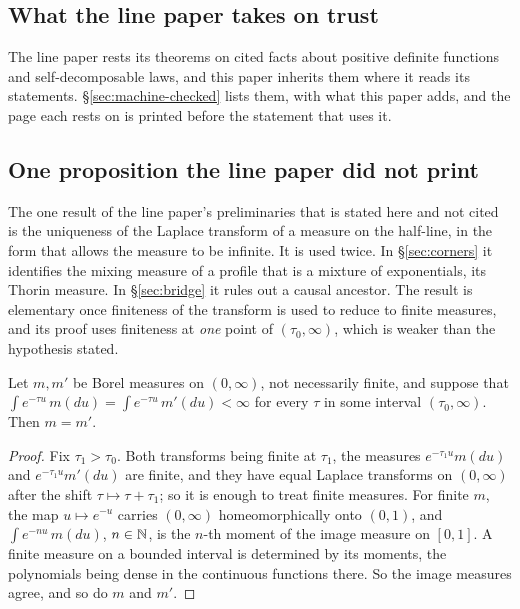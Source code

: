 \subsection{What the line paper takes on trust}\label{sec:line-trust}

The line paper rests its theorems on cited facts about positive definite functions and
self-decomposable laws, and this paper inherits them where it reads its statements.
\S\ref{sec:machine-checked} lists them, with what this paper adds, and the page each rests on
is printed before the statement that uses it.

\subsection{One proposition the line paper did not print}\label{sec:laplace-uniqueness}

The one result of the line paper's preliminaries that is stated here and not cited is the
uniqueness of the Laplace transform of a measure on the half-line, in the form that allows the
measure to be infinite. It is used twice. In \S\ref{sec:corners} it identifies the mixing
measure of a profile that is a mixture of exponentials, its Thorin measure. In
\S\ref{sec:bridge} it rules out a causal ancestor. The result is elementary once finiteness of
the transform is used to reduce to finite measures, and its proof uses finiteness at \emph{one}
point of $(\tau_0,\infty)$, which is weaker than the hypothesis stated.

\begin{proposition}
\label{prop:laplace-uniqueness-locally-finite}
Let $m, m'$ be Borel measures on $(0,\infty)$, not necessarily finite, and suppose that
$\int e^{-\tau u}\,m(du) = \int e^{-\tau u}\,m'(du) < \infty$ for every $\tau$ in some
interval $(\tau_0,\infty)$. Then $m = m'$.
\end{proposition}

\begin{proof}
Fix $\tau_1 > \tau_0$. Both transforms being finite at $\tau_1$, the measures
$e^{-\tau_1 u}m(du)$ and $e^{-\tau_1 u}m'(du)$ are finite, and they have equal Laplace
transforms on $(0,\infty)$ after the shift $\tau \mapsto \tau + \tau_1$; so it is enough to
treat finite measures. For finite $m$, the map $u \mapsto e^{-u}$ carries $(0,\infty)$
homeomorphically onto $(0,1)$, and $\int e^{-n u}\,m(du)$, $n \in \mathbb{N}$, is the $n$-th moment
of the image measure on $[0,1]$. A finite measure on a bounded interval is determined by its
moments, the polynomials being dense in the continuous functions there. So the image measures
agree, and so do $m$ and $m'$.
\end{proof}
